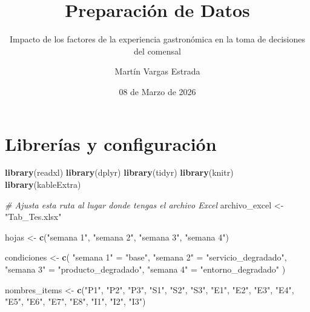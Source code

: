 \documentclass[
  spanish,
]{article}
\title{Preparación de Datos}
\subtitle{Impacto de los factores de la experiencia gastronómica en la
toma de decisiones del comensal}
\author{Martín Vargas Estrada}
\date{08 de Marzo de 2026}
\newenvironment{Shaded}{\begin{snugshade}}{\end{snugshade}}
\newcommand{\CommentTok}[1]{\textcolor[rgb]{0.56,0.35,0.01}{\textit{#1}}}
\newcommand{\FunctionTok}[1]{\textcolor[rgb]{0.13,0.29,0.53}{\textbf{#1}}}
\newcommand{\NormalTok}[1]{#1}
\newcommand{\OtherTok}[1]{\textcolor[rgb]{0.56,0.35,0.01}{#1}}
\newcommand{\StringTok}[1]{\textcolor[rgb]{0.31,0.60,0.02}{#1}}
\begin{document}
\maketitle

{
\setcounter{tocdepth}{2}
\tableofcontents
}
\section{Librerías y
configuración}\label{libreruxedas-y-configuraciuxf3n}

\begin{Shaded}
\begin{Highlighting}[]
\FunctionTok{library}\NormalTok{(readxl)}
\FunctionTok{library}\NormalTok{(dplyr)}
\FunctionTok{library}\NormalTok{(tidyr)}
\FunctionTok{library}\NormalTok{(knitr)}
\FunctionTok{library}\NormalTok{(kableExtra)}
\end{Highlighting}
\end{Shaded}

\begin{Shaded}
\begin{Highlighting}[]
\CommentTok{\# Ajusta esta ruta al lugar donde tengas el archivo Excel}
\NormalTok{archivo\_excel }\OtherTok{\textless{}{-}} \StringTok{"Tab\_Tes.xlsx"}

\NormalTok{hojas }\OtherTok{\textless{}{-}} \FunctionTok{c}\NormalTok{(}\StringTok{"semana 1"}\NormalTok{, }\StringTok{"semana 2"}\NormalTok{, }\StringTok{"semana 3"}\NormalTok{, }\StringTok{"semana 4"}\NormalTok{)}

\NormalTok{condiciones }\OtherTok{\textless{}{-}} \FunctionTok{c}\NormalTok{(}
  \StringTok{"semana 1"} \OtherTok{=} \StringTok{"base"}\NormalTok{,}
  \StringTok{"semana 2"} \OtherTok{=} \StringTok{"servicio\_degradado"}\NormalTok{,}
  \StringTok{"semana 3"} \OtherTok{=} \StringTok{"producto\_degradado"}\NormalTok{,}
  \StringTok{"semana 4"} \OtherTok{=} \StringTok{"entorno\_degradado"}
\NormalTok{)}

\NormalTok{nombres\_items }\OtherTok{\textless{}{-}} \FunctionTok{c}\NormalTok{(}\StringTok{"P1"}\NormalTok{, }\StringTok{"P2"}\NormalTok{, }\StringTok{"P3"}\NormalTok{,}
                   \StringTok{"S1"}\NormalTok{, }\StringTok{"S2"}\NormalTok{, }\StringTok{"S3"}\NormalTok{,}
                   \StringTok{"E1"}\NormalTok{, }\StringTok{"E2"}\NormalTok{, }\StringTok{"E3"}\NormalTok{, }\StringTok{"E4"}\NormalTok{,}
                   \StringTok{"E5"}\NormalTok{, }\StringTok{"E6"}\NormalTok{, }\StringTok{"E7"}\NormalTok{, }\StringTok{"E8"}\NormalTok{,}
                   \StringTok{"I1"}\NormalTok{, }\StringTok{"I2"}\NormalTok{, }\StringTok{"I3"}\NormalTok{)}
\end{Highlighting}
\end{Shaded}
\end{document}

